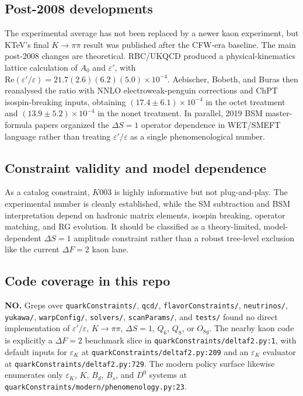 \subsection*{Post-2008 developments}
The experimental average has not been replaced by a newer kaon experiment, but
KTeV's final \(K\to\pi\pi\) result was published after the CFW-era baseline.
The main post-2008 changes are theoretical.  RBC/UKQCD produced a
physical-kinematics lattice calculation of \(A_0\) and \(\varepsilon'\), with
\(\mathrm{Re}(\varepsilon'/\varepsilon)=
21.7(2.6)(6.2)(5.0)\times10^{-4}\).  Aebischer, Bobeth, and Buras then
reanalysed the ratio with NNLO electroweak-penguin corrections and ChPT
isospin-breaking inputs, obtaining
\((17.4\pm6.1)\times10^{-4}\) in the octet treatment and
\((13.9\pm5.2)\times10^{-4}\) in the nonet treatment.  In parallel, 2019
BSM master-formula papers organized the \(\Delta S=1\) operator dependence
in WET/SMEFT language rather than treating \(\varepsilon'/\varepsilon\) as a
single phenomenological number.

\subsection*{Constraint validity and model dependence}
As a catalog constraint, \(K003\) is highly informative but not plug-and-play.
The experimental number is cleanly established, while the SM subtraction and
BSM interpretation depend on hadronic matrix elements, isospin breaking,
operator matching, and RG evolution.  It should be classified as a
theory-limited, model-dependent \(\Delta S=1\) amplitude constraint rather
than a robust tree-level exclusion like the current \(\Delta F=2\) kaon lane.

\subsection*{Code coverage in this repo}
\textbf{NO.}  Greps over \texttt{quarkConstraints/}, \texttt{qcd/},
\texttt{flavorConstraints/}, \texttt{neutrinos/}, \texttt{yukawa/},
\texttt{warpConfig/}, \texttt{solvers/}, \texttt{scanParams/}, and
\texttt{tests/} found no direct implementation of
\(\varepsilon'/\varepsilon\), \(K\to\pi\pi\), \(\Delta S=1\), \(Q_6\),
\(Q_8\), or \(O_{8g}\).  The nearby kaon code is explicitly a
\(\Delta F=2\) benchmark slice in \texttt{quarkConstraints/deltaf2.py:1},
with default inputs for \(\varepsilon_K\) at
\texttt{quarkConstraints/deltaf2.py:209} and an
\(\varepsilon_K\) evaluator at \texttt{quarkConstraints/deltaf2.py:729}.
The modern policy surface likewise enumerates only
\(\varepsilon_K\), \(K\), \(B_d\), \(B_s\), and \(D^0\) systems at
\texttt{quarkConstraints/modern/phenomenology.py:23}.

